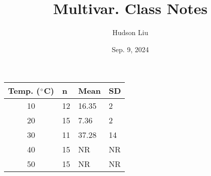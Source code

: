 \documentclass{article}
\title{Multivar. Class Notes}
\author{Hudson Liu}
\date{Sep. 9, 2024}
\begin{document}
\centering
\begin{tabular}[t]{clll}
Temp. ($\degree$C)&n&Mean&SD\\
\hline
10&12&16.35&2\\
20&15&7.36&2\\
30&11&37.28&14\\
40&15&NR&NR\\
50&15&NR&NR\\
\hline
\end{tabular}
\end{document}
